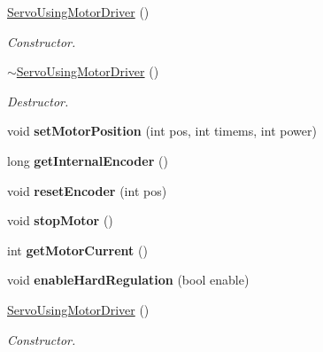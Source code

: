 \begin{DoxyCompactItemize}
\hyperlink{classServoUsingMotorDriver_acc8ccf92143efa853b83940d2d690817}{Servo\+Using\+Motor\+Driver} ()
\begin{DoxyCompactList}\small\item\em Constructor. \end{DoxyCompactList}\item 
\mbox{\label{classServoUsingMotorDriver_a8aa604a17555514d3ddf78e15f467faf}} 
\hyperlink{classServoUsingMotorDriver_a8aa604a17555514d3ddf78e15f467faf}{$\sim$\+Servo\+Using\+Motor\+Driver} ()
\begin{DoxyCompactList}\small\item\em Destructor. \end{DoxyCompactList}\item 
\mbox{\label{classServoUsingMotorDriver_a9569643c48ac9d6c1936e8562825e280}} 
void {\bfseries set\+Motor\+Position} (int pos, int timems, int power)
\item 
\mbox{\label{classServoUsingMotorDriver_a64c62fd0ecb287fe45770c387e394eac}} 
long {\bfseries get\+Internal\+Encoder} ()
\item 
\mbox{\label{classServoUsingMotorDriver_acf78dbe83df0a7744fd40920a6388efd}} 
void {\bfseries reset\+Encoder} (int pos)
\item 
\mbox{\label{classServoUsingMotorDriver_a58fbf805d7bb382b505ea634e6bcbb08}} 
void {\bfseries stop\+Motor} ()
\item 
\mbox{\label{classServoUsingMotorDriver_ad76b35929d55c4249c5e7c3818c053b6}} 
int {\bfseries get\+Motor\+Current} ()
\item 
\mbox{\label{classServoUsingMotorDriver_adeb6e60d59bac919b7dc45c6f4a4f32c}} 
void {\bfseries enable\+Hard\+Regulation} (bool enable)
\item 
\mbox{\label{classServoUsingMotorDriver_acc8ccf92143efa853b83940d2d690817}} 
\hyperlink{classServoUsingMotorDriver_acc8ccf92143efa853b83940d2d690817}{Servo\+Using\+Motor\+Driver} ()
\begin{DoxyCompactList}\small\item\em Constructor. \end{DoxyCompactList}\item 

\end{DoxyCompactItemize}
